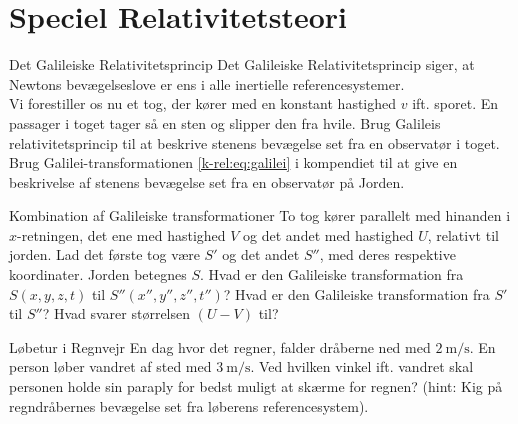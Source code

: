 \documentclass[crop=false, class=memoir]{standalone}
\begin{document}
\chapter{Speciel Relativitetsteori} \label{chap:rel_opg}


\begin{opgave}[1]{Det Galileiske Relativitetsprincip}
Det Galileiske Relativitetsprincip siger, at Newtons bevægelseslove er ens i alle inertielle referencesystemer.\\
Vi forestiller os nu et tog, der kører med en konstant hastighed $v$ ift. sporet. En passager i toget tager så en sten og slipper den fra hvile.  
\opg Brug Galileis relativitetsprincip til at beskrive stenens bevægelse set fra en observatør i toget.
\opg Brug Galilei-transformationen \cref{k-rel:eq:galilei} i kompendiet til at give en beskrivelse af stenens bevægelse set fra en observatør på Jorden. 
\end{opgave}

\begin{opgave}[1]{Kombination af Galileiske transformationer}	
	To tog kører parallelt med hinanden i $x$-retningen, det ene med hastighed $V$ og det andet med hastighed $U$,
	relativt til jorden. Lad det første tog være $S'$ og det andet $S''$, med deres respektive koordinater. Jorden betegnes $S$.
	\opg Hvad er den Galileiske transformation fra $S \left( x,y,z,t \right)$ til $S'' \left( x'',y'',z'',t'' \right)$?
	\opg Hvad er den Galileiske transformation fra $S'$ til $S''$?
	\opg Hvad svarer størrelsen $\left( U- V \right)$ til?	 
\end{opgave}

\begin{opgave}[1]{Løbetur i Regnvejr}
En dag hvor det regner, falder dråberne ned med $\SI{2}{\metre\per\second}$. En person løber vandret af sted med $\SI{3}{\metre\per\second}$. Ved hvilken vinkel ift. vandret skal personen holde sin paraply for bedst muligt at skærme for regnen? (hint: Kig på regndråbernes bevægelse set fra løberens referencesystem).
\end{opgave}
\end{document}
